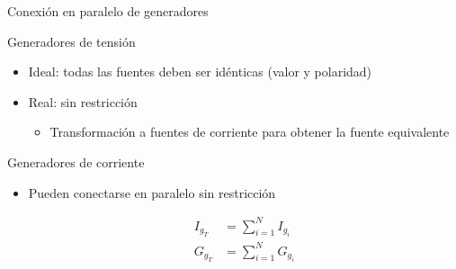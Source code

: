\documentclass[aspectratio=169, xcolor={usenames,svgnames,dvipsnames}]{beamer}
\begin{document}

\begin{frame}{Conexión en paralelo de generadores}

    \begin{block}{Generadores de tensión}
    \begin{itemize}
    \vspace{2mm}
    \item \alert{Ideal}: todas las fuentes \alert{deben ser idénticas} (valor y polaridad)
    \vspace{2mm}
    \item \alert{Real}:  sin restricción
        \begin{itemize}
        \item \normalsize{Transformación a fuentes de corriente para obtener la \alert{fuente equivalente}}
        \end{itemize}
    \end{itemize}
    \end{block}    
    
    \begin{block}{Generadores de corriente}
    \begin{itemize}
    \item Pueden conectarse en paralelo \alert{sin restricción}

    \vspace{-5mm}
    \begin{align*}
      I_{g_T} &= \sum_{i = 1}^N I_{g_i}\\
      G_{g_T} &= \sum_{i = 1}^N G_{g_i}
    \end{align*}
    \end{itemize}
    \vspace{-3mm}
    \end{block}
\end{frame}

\end{document}
